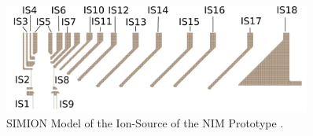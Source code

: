 	
	

		
		\begin{figure}[h] %
			\centering
			\includegraphics[width= 0.9\textwidth]{Setup/Proto_IS_sim.png}
			\caption{SIMION Model of the Ion-Source of the NIM Prototype \cite{Diss_Meyer}.}
			\label{fig:SetupProtoISSim}
		\end{figure}
		
